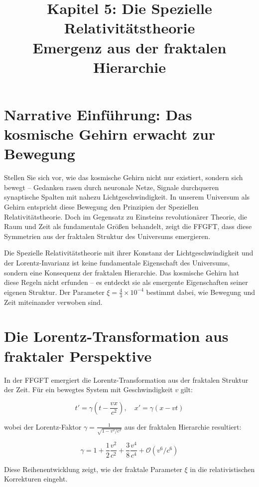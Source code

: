 \documentclass[12pt,a4paper]{article}
\title{Kapitel 5: Die Spezielle Relativitätstheorie\\
Emergenz aus der fraktalen Hierarchie}
\author{}
\begin{document}
\maketitle

\section*{Narrative Einführung: Das kosmische Gehirn erwacht zur Bewegung}

Stellen Sie sich vor, wie das kosmische Gehirn nicht nur existiert, sondern sich bewegt -- Gedanken rasen durch neuronale Netze, Signale durchqueren synaptische Spalten mit nahezu Lichtgeschwindigkeit. In unserem Universum als Gehirn entspricht diese Bewegung den Prinzipien der Speziellen Relativitätstheorie. Doch im Gegensatz zu Einsteins revolutionärer Theorie, die Raum und Zeit als fundamentale Größen behandelt, zeigt die FFGFT, dass diese Symmetrien aus der fraktalen Struktur des Universums emergieren.

Die Spezielle Relativitätstheorie mit ihrer Konstanz der Lichtgeschwindigkeit und der Lorentz-Invarianz ist keine fundamentale Eigenschaft des Universums, sondern eine Konsequenz der fraktalen Hierarchie. Das kosmische Gehirn hat diese Regeln nicht erfunden -- es entdeckt sie als emergente Eigenschaften seiner eigenen Struktur. Der Parameter $\xi = \frac{4}{3} \times 10^{-4}$ bestimmt dabei, wie Bewegung und Zeit miteinander verwoben sind.

\section{Die Lorentz-Transformation aus fraktaler Perspektive}

In der FFGFT emergiert die Lorentz-Transformation aus der fraktalen Struktur der Zeit. Für ein bewegtes System mit Geschwindigkeit $v$ gilt:

\begin{equation}
t' = \gamma(t - \frac{vx}{c^2}), \quad x' = \gamma(x - vt)
\end{equation}

wobei der Lorentz-Faktor $\gamma = \frac{1}{\sqrt{1 - v^2/c^2}}$ aus der fraktalen Hierarchie resultiert:

\begin{equation}
\gamma = 1 + \frac{1}{2}\frac{v^2}{c^2} + \frac{3}{8}\frac{v^4}{c^4} + \mathcal{O}(v^6/c^6)
\end{equation}

Diese Reihenentwicklung zeigt, wie der fraktale Parameter $\xi$ in die relativistischen Korrekturen eingeht.
\end{document}
